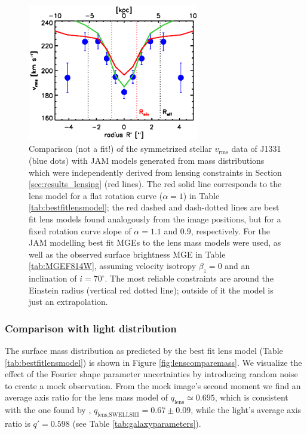 \documentclass[useAMS,usenatbib]{mnras}
\begin{document}
\begin{figure}
  \centering
  \includegraphics[height=6cm]{fig/lensing_JAM_comparision.ps}
  \caption{Comparison (not a fit!) of the symmetrized stellar $v_\text{rms}$ data of J1331 (blue dots) with JAM models generated from mass distributions which were independently derived from lensing constraints in Section \ref{sec:results_lensing} (red lines). The red solid line corresponds to the lens model for a flat rotation curve ($\alpha = 1$) in Table \ref{tab:bestfitlensmodel}; the red dashed and dash-dotted lines are best fit lens models found analogously from the image positions, but for a fixed rotation curve slope of $\alpha = 1.1$ and $0.9$, respectively. For the JAM modelling best fit MGEs to the lens mass models were used, as well as the observed surface brightness MGE in Table \ref{tab:MGEF814W}, assuming velocity isotropy $\beta_z = 0$ and an inclination of $i = 70^\circ$. The most reliable constraints are around the Einstein radius (vertical red dotted line); outside of it the model is just an extrapolation.}
  \label{fig:JAM_modelL}
\end{figure}

\subsubsection{Comparison with light distribution} \label{sec:results_lensing_compare}

The surface mass distribution as predicted by the best fit lens model (Table \ref{tab:bestfitlensmodel}) is shown in Figure \ref{fig:lenscomparemass}. We visualize the effect of the Fourier shape parameter uncertainties by introducing random noise to create a mock observation. From the mock image's second moment we find an average axis ratio for the lens mass model of $q_\text{lens} \simeq 0.695$, which is consistent with the one found by \citet{SWELLSIII}, $q_\text{lens,SWELLSIII} = 0.67 \pm 0.09$, while the light's average axis ratio is $q' = 0.598$ (see Table \ref{tab:galaxyparameters}).
\end{document}

